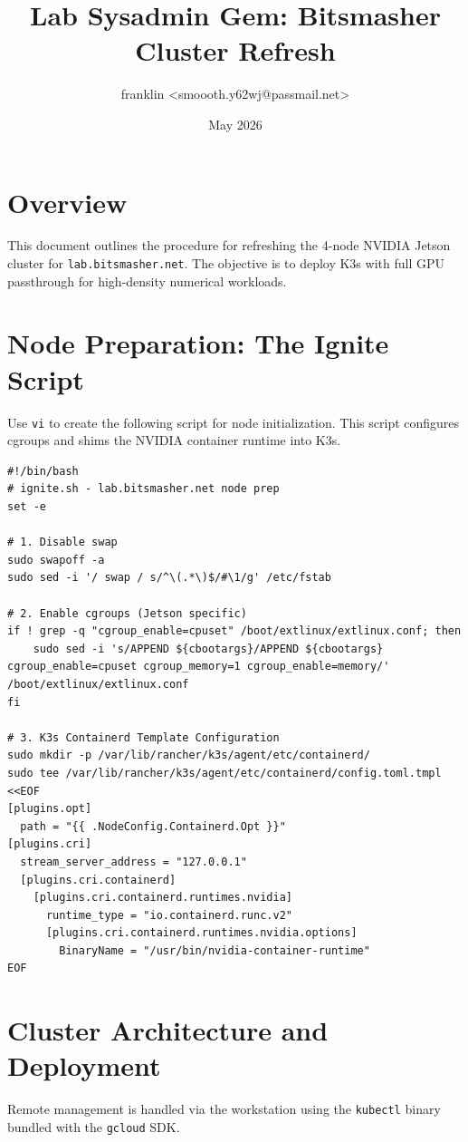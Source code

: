 \documentclass[11pt,a4paper]{article}
\title{Lab Sysadmin Gem: Bitsmasher Cluster Refresh}
\author{franklin <smoooth.y62wj@passmail.net>}
\date{May 2026}
\begin{document}
\maketitle

\section{Overview}
This document outlines the procedure for refreshing the 4-node NVIDIA Jetson cluster for \texttt{lab.bitsmasher.net}. The objective is to deploy K3s with full GPU passthrough for high-density numerical workloads.

\section{Node Preparation: The Ignite Script}
Use \texttt{vi} to create the following script for node initialization. This script configures cgroups and shims the NVIDIA container runtime into K3s.

\begin{verbatim}
#!/bin/bash
# ignite.sh - lab.bitsmasher.net node prep
set -e

# 1. Disable swap
sudo swapoff -a
sudo sed -i '/ swap / s/^\(.*\)$/#\1/g' /etc/fstab

# 2. Enable cgroups (Jetson specific)
if ! grep -q "cgroup_enable=cpuset" /boot/extlinux/extlinux.conf; then
    sudo sed -i 's/APPEND ${cbootargs}/APPEND ${cbootargs} cgroup_enable=cpuset cgroup_memory=1 cgroup_enable=memory/' /boot/extlinux/extlinux.conf
fi

# 3. K3s Containerd Template Configuration
sudo mkdir -p /var/lib/rancher/k3s/agent/etc/containerd/
sudo tee /var/lib/rancher/k3s/agent/etc/containerd/config.toml.tmpl <<EOF
[plugins.opt]
  path = "{{ .NodeConfig.Containerd.Opt }}"
[plugins.cri]
  stream_server_address = "127.0.0.1"
  [plugins.cri.containerd]
    [plugins.cri.containerd.runtimes.nvidia]
      runtime_type = "io.containerd.runc.v2"
      [plugins.cri.containerd.runtimes.nvidia.options]
        BinaryName = "/usr/bin/nvidia-container-runtime"
EOF
\end{verbatim}

\section{Cluster Architecture and Deployment}
Remote management is handled via the workstation using the \texttt{kubectl} binary bundled with the \texttt{gcloud} SDK.
\end{document}

